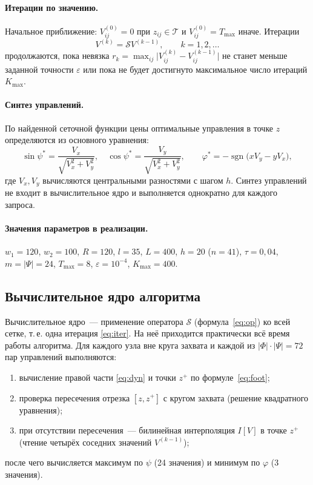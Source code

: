 \documentclass[14pt,a4paper]{extarticle}
\newcommand{\sgn}{\operatorname{sgn}}
\newcommand{\Tmax}{T_{\max}}
\begin{document}
\paragraph{Итерации по значению.}
Начальное приближение: $V^{(0)}_{ij}=0$ при $z_{ij}\in\mathcal{T}$ и
$V^{(0)}_{ij}=\Tmax$ иначе. Итерации
\begin{equation}\label{eq:iter}
	V^{(k)}=\mathcal{S}V^{(k-1)},\qquad k=1,2,\dots
\end{equation}
продолжаются, пока невязка
$r_k=\max_{ij}\bigl|V^{(k)}_{ij}-V^{(k-1)}_{ij}\bigr|$ не станет меньше
заданной точности $\varepsilon$ или пока не будет достигнуто
максимальное число итераций $K_{\max}$.

\paragraph{Синтез управлений.}
По найденной сеточной функции цены оптимальные управления в точке $z$
определяются из основного уравнения:
\[
	\sin\psi^{*}=\frac{V_x}{\sqrt{V_x^2+V_y^2}},\quad
	\cos\psi^{*}=\frac{V_y}{\sqrt{V_x^2+V_y^2}},\qquad
	\varphi^{*}=-\sgn\bigl(x V_y - y V_x\bigr),
\]
где $V_x,V_y$ вычисляются центральными разностями с шагом $h$.
Синтез управлений не входит в вычислительное ядро и выполняется
однократно для каждого запроса.

\paragraph{Значения параметров в реализации.}
$w_1=120$, $w_2=100$, $R=120$, $l=35$, $L=400$, $h=20$ ($n=41$),
$\tau=0{,}04$, $m=|\Psi|=24$, $\Tmax=8$, $\varepsilon=10^{-4}$,
$K_{\max}=400$.

\subsection{Вычислительное ядро алгоритма}

Вычислительное ядро~--- применение оператора $\mathcal{S}$
(формула~\eqref{eq:op}) ко всей сетке, т.\,е. одна итерация
\eqref{eq:iter}. На неё приходится практически всё время работы
алгоритма. Для каждого узла вне круга захвата и каждой из
$|\Phi|\cdot|\Psi|=72$ пар управлений выполняются:
\begin{enumerate}
	\item вычисление правой части \eqref{eq:dyn} и точки $z^{+}$ по
	формуле~\eqref{eq:foot};
	\item проверка пересечения отрезка $[z,z^{+}]$ с кругом захвата
	(решение квадратного уравнения);
	\item при отсутствии пересечения~--- билинейная интерполяция $I[V]$ в
	точке $z^{+}$ (чтение четырёх соседних значений $V^{(k-1)}$);
\end{enumerate}
после чего вычисляется максимум по $\psi$ (24 значения) и минимум по
$\varphi$ (3 значения).
\end{document}

